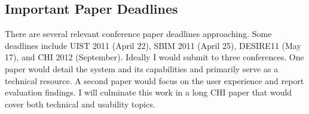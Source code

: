 \documentclass[12pt]{article}
\begin{document}
\subsection{Important Paper Deadlines}
\label{sec:important-paper-deadlines}

There are several relevant conference paper deadlines
approaching. Some deadlines include UIST 2011 (April 22), SBIM 2011
(April 25), DESIRE11 (May 17), and CHI 2012 (September). Ideally I
would submit to three conferences. One paper would detail the system
and its capabilities and primarily serve as a technical resource. A
second paper would focus on the user experience and report evaluation
findings. I will culminate this work in a long CHI paper that would
cover both technical and usability topics.

\singlespacing\newpage



\end{document}
